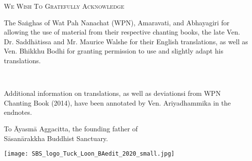 \cleartorecto
\thispagestyle{empty}

{\setlength{\parskip}{10pt}

{\centering\fontsize{20}{25}\selectfont
\textsc{We Wish To Gratefully Acknowledge}
\par}

The Saṅghas of Wat Pah Nanachat (WPN), Amaravati, and Abhayagiri for allowing the use of material from their respective chanting books, the late Ven. Dr. Saddhātissa and Mr. Maurice Walshe for their English translations, as well as Ven. Bhikkhu Bodhi for granting permission to use and slightly adapt his translations.

\

Additional information on translations, as well as deviationsi from WPN Chanting Book (2014), have been annotated by Ven. Ariyadhammika in the endnotes.

\bigskip

{\centering
To Āyasmā Aggacitta, the founding father of\\
Sāsanārakkha Buddhist Sanctuary.

\bigskip

\texttt{[image: SBS\_logo\_Tuck\_Loon\_BAedit\_2020\_small.jpg]}

}

}
